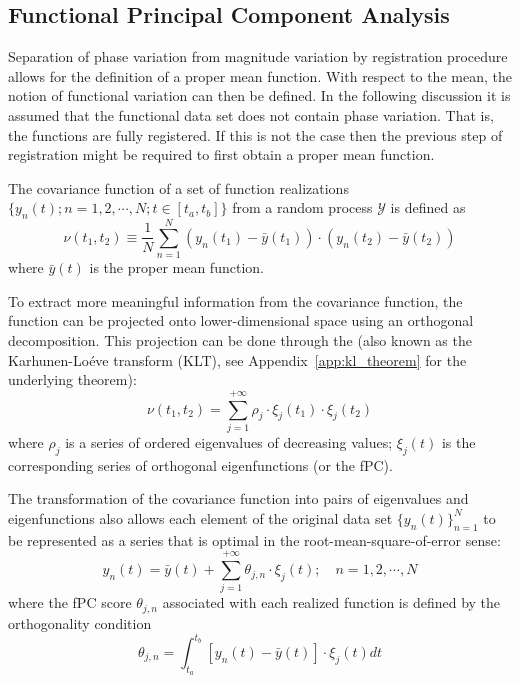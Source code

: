 \subsection{Functional Principal Component Analysis}\label{sub:sa_fpca}

Separation of phase variation from magnitude variation by registration procedure allows for the definition of a proper mean function.
With respect to the mean, the notion of functional variation can then be defined.
In the following discussion it is assumed that the functional data set does not contain phase variation.
That is, the functions are fully registered.
If this is not the case then the previous step of registration might be required to first obtain a proper mean function.

The covariance function of a set of function realizations $\{y_n(t);n = 1, 2, \cdots, N; t \in [t_a,t_b]\}$ from a random process $\mathcal{Y}$ is defined as
\begin{equation}
	\nu (t_1, t_2) \equiv \frac{1}{N} \sum_{n=1}^{N} (y_n(t_1) - \bar{y}(t_1)) \cdot (y_n(t_2) - \bar{y}(t_2))
\label{eq:covariance_function}
\end{equation}
where $\bar{y} (t)$ is the proper mean function.

To extract more meaningful information from the covariance function,
the function can be projected onto lower-dimensional space using an orthogonal decomposition.
This projection can be done through the  (also known as the Karhunen-Lo\'eve transform (KLT), see Appendix~\ref{app:kl_theorem} for the underlying theorem):
\begin{equation}
	\nu (t_1, t_2) = \sum_{j=1}^{+\infty} \rho_j \cdot \xi_j(t_1) \cdot \xi_j(t_2)
\label{eq:kl_transform}
\end{equation}
where $\rho_j$ is a series of ordered eigenvalues of decreasing values; 
$\xi_j(t)$ is the corresponding series of orthogonal eigenfunctions (or the fPC).

The transformation of the covariance function into pairs of eigenvalues and eigenfunctions also allows each element of the original data set $\{y_n(t)\}^N_{n=1}$ to be represented as a series that is optimal in the root-mean-square-of-error sense:
\begin{equation}
  y_n(t) = \bar{y}(t) + \sum_{j=1}^{+\infty} \theta_{j,n} \cdot \xi_j (t); \quad n = 1, 2, \cdots, N
\label{eq:pod}
\end{equation}
where the fPC score $\theta_{j,n}$ associated with each realized function is defined by the orthogonality condition
\begin{equation}
  \theta_{j,n} = \int_{t_a}^{t_b} \left[y_n(t) - \bar{y}(t)\right] \cdot \xi_j (t) dt
\label{eq:pod_orthogonality}
\end{equation}

